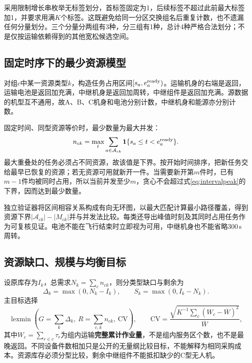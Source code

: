 \documentclass[a4paper]{my_paper}%
\numberwithin{equation}{section}
\newcommand{\lexmin}{\operatorname{lexmin}}
\newcommand{\ind}{\mathbf{1}}
\theoremstyle{definition}
\begin{document}
采用限制增长串枚举无标签划分，首标签固定为1，后续标签不超过此前最大标签加1，并要求用满$K$个标签。这既避免给同一分区交换组名后重复计数，也不遗漏任何分量划分。三个分量分两组有3种，分三组有1种，总计4种严格合法划分；不是仅按运输依赖得到的其他宽松候选空间。

\subsection{固定时序下的最少资源模型}
对组$c$中某一资源类型$k$，构造任务占用区间$[s_a,e_a^{\rm ready})$。运输机身的右端是返回，运输电池是返回加充满，中继机身是返回加周转，中继组件是返回加充满。源数据的机型互不通用，故A、B、C机身和电池分别计数，中继机身和能源亦分别计数。

固定时间、同型资源等价时，最少数量为最大并发：
\begin{equation}
 n_{ck}=\max_t\sum_{a\in\mathcal A_{ck}}\ind\{s_a\le t<e_a^{\rm ready}\}.
 \label{eq:intervalpeak}
\end{equation}
最大重叠处的任务必须占不同资源，故该值是下界。按开始时间排序，把新任务交给最早已恢复的资源；若无资源可用就新开一件。当需要新开第$m$件时，已有$m-1$件均被同时占用，所以当前并发至少$m$，贪心不会超过式\eqref{eq:intervalpeak}的下界，因而达到最少数量。

独立验证器将区间相容关系构成有向无环图，以最大匹配计算最小路径覆盖，得到资源下界$|\mathcal A_{ck}|-|M_{ck}|$并与并发法比较。每类还导出峰值时刻及其同时占用任务作为可复核见证。电池不能在飞行结束时立即视为可用，中继机身也不能省略300\,s周转。

\subsection{资源缺口、规模与均衡目标}
设原库存为$I_k$，总需求$N_k=\sum_c n_{ck}$，则分类型缺口与剩余为
\begin{equation}
 \Delta_k=\max(0,N_k-I_k),\qquad
 S_k=\max(0,I_k-N_k).
 \label{eq:typedgap}
\end{equation}
主目标选择
\begin{equation}
 \lexmin\left(G=\sum_k\Delta_k,\ R=\sum_{c,k}n_{ck},\ \mathrm{CV}\right),\qquad
 \mathrm{CV}=\frac{\sqrt{K^{-1}\sum_c(W_c-\overline W)^2}}{\overline W},
 \label{eq:q4objective}
\end{equation}
其中$W_c=\sum_{r\in c}\tau_r$为组内运输\textbf{完整累计作业量}，不是组内服务区个数，也不是最晚返回。不同设备件数相加只是公开的无量纲比较目标，不能解释为相同采购成本。资源库存必须分型比较，剩余中继组件不能抵扣缺少的C型无人机。
\end{document}
